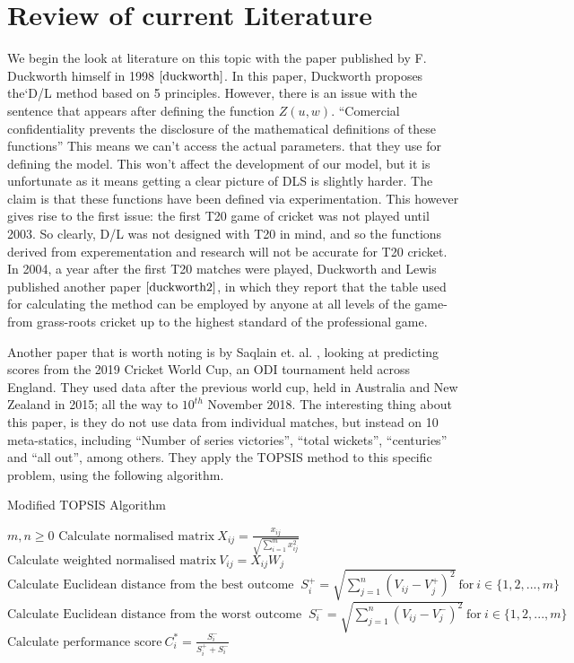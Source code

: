 \section{Review of current Literature}
We begin the look at literature on this topic with the paper published by F. Duckworth himself in 1998 $\cite{duckworth}$. In this paper, 
Duckworth proposes the`D/L method based on 5 principles. However, there is an issue with the sentence that appears after defining the function $Z(u,w)$.
``Comercial confidentiality prevents the disclosure of the mathematical definitions of these functions'' This means we can't access the actual parameters. 
that they use for defining the model. This won't affect the development of our model, but it is unfortunate as it means getting a clear picture of DLS is slightly harder.
The claim is that these functions have been defined via experimentation. This however gives rise to the first issue: the first T20 game of cricket was not played until 2003. 
So clearly, D/L was not designed with T20 in mind, and so the functions derived from experementation and research will not be accurate for T20 cricket. \\

In 2004, a year after the first T20 matches were played, Duckworth and Lewis published another paper $\cite{duckworth2}$, in which they report
that the table used for calculating the method can be employed by anyone at all levels of the game- from grass-roots cricket up to the highest standard of 
the professional game. 

Another paper that is worth noting is by Saqlain et. al. \cite{saqlain}, looking at predicting scores from the 2019 Cricket World Cup, an ODI
tournament held across England. They used data after the previous world cup, held in Australia and New Zealand in 2015; all the way to $10^{th}$ November
2018. The interesting thing about this paper, is they do not use data from individual matches, but instead on 10 meta-statics, including 
``Number of series victories'', ``total wickets'', ``centuries'' and ``all out'', among others. They apply the TOPSIS method to this specific problem, using the 
following algorithm. \\
\begin{algorithm}
\caption{Modified TOPSIS Algorithm}\label{TOPSIS}
\begin{algorithmic}[1]
    \Require $m,n \geq 0$
    \State $\text{Calculate normalised matrix} \ X_{ij} = \frac{x_{ij}}{\sqrt{\sum_{i=1}^mx_{ij}^2}}$
    \State $\text{Calculate weighted normalised matrix} \ V_{ij}=X_{ij}W_j$
    \State $\text{Calculate Euclidean distance from the best outcome } \ S_i^+ = \sqrt{\sum_{j=1}^n(V_{ij}-V_j^+)^2} \ \text{for} \ i \in \{1,2,...,m\}$
    \State $\text{Calculate Euclidean distance from the worst outcome } \ S_i^- = \sqrt{\sum_{j=1}^n(V_{ij}-V_j^-)^2} \ \text{for} \ i \in \{1,2,...,m\}$
    \State $\text{Calculate performance score} \ C_i^* = \frac{S_i^-}{S_i^+  + S_i^-}$
\end{algorithmic}
\end{algorithm}

